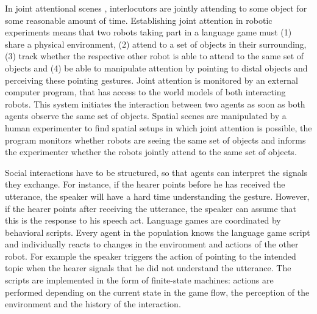 In joint attentional scenes \citep{tomasello1995joint}, interlocutors 
are jointly attending to some object for some reasonable amount of time.
Establishing joint attention in robotic experiments means that two robots 
taking part in a language game must (1) share a physical environment, 
(2) attend to a set of objects in their surrounding, (3) track whether the 
respective other robot is able to attend to the same set of objects and 
(4) be able to manipulate attention by pointing to distal objects and perceiving
these pointing gestures.  Joint attention is monitored by an external computer 
program, that has access to the world models of both interacting robots.  This system
initiates the interaction between two agents as soon as both agents
observe the same set of objects.  Spatial scenes are manipulated 
by a human experimenter to find spatial setups in which joint attention is
possible, the program monitors whether robots are seeing the same
set of objects and informs the experimenter whether the robots jointly attend 
to the same set of objects.

Social interactions have to be structured, so that agents can interpret the 
signals they exchange. For instance, if the hearer points before
he has received the utterance, the speaker will have a hard time 
understanding the gesture. However, if the hearer points after
receiving the utterance, the speaker can assume that this is the response
to his speech act. Language games are coordinated by behavioral scripts. 
Every agent in the population knows the language game script and individually reacts
to changes in the environment and actions of the other robot. For
example the speaker triggers the action of pointing to the intended
topic when the hearer signals that he did not understand the
utterance. The scripts are implemented in the form of finite-state
machines: actions are performed depending on the current state in the
game flow, the perception of the environment and the history of the
interaction.

